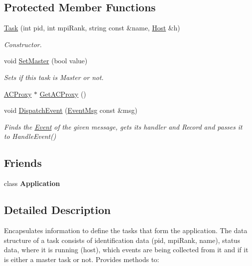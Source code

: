 \subsection*{Protected Member Functions}
\begin{DoxyCompactItemize}
\item 
\hyperlink{class_model_1_1_task_a334ea9c1df40aebee576d9cf0646c0ea}{Task} (int pid, int mpi\-Rank, string const \&name, \hyperlink{class_model_1_1_host}{Host} \&h)
\begin{DoxyCompactList}\small\item\em Constructor. \end{DoxyCompactList}\item 
void \hyperlink{class_model_1_1_task_a013b50c42c6a729869d665c610b3cd09}{Set\-Master} (bool value)
\begin{DoxyCompactList}\small\item\em Sets if this task is Master or not. \end{DoxyCompactList}\item 
\hyperlink{class_a_c_proxy}{A\-C\-Proxy} $\ast$ \hyperlink{class_model_1_1_task_aec9e577c6b17988481d08e3922800e7d}{Get\-A\-C\-Proxy} ()
\item 
void \hyperlink{class_model_1_1_task_a632d2809726ca0afc77f04639860d5e5}{Dispatch\-Event} (\hyperlink{class_common_1_1_event_msg}{Event\-Msg} const \&msg)
\begin{DoxyCompactList}\small\item\em Finds the \hyperlink{class_model_1_1_event}{Event} of the given message, gets its handler and Record and passes it to Handle\-Event() \end{DoxyCompactList}\end{DoxyCompactItemize}
\subsection*{Friends}
\begin{DoxyCompactItemize}
\item 
\hypertarget{class_model_1_1_task_a23f25bcc02a0e94c2f5a4188496b04d0}{class {\bfseries Application}}\label{class_model_1_1_task_a23f25bcc02a0e94c2f5a4188496b04d0}

\end{DoxyCompactItemize}


\subsection{Detailed Description}
Encapsulates information to define the tasks that form the application. The data structure of a task consists of identification data (pid, mpi\-Rank, name), status data, where it is running (host), which events are being collected from it and if it is either a master task or not. Provides methods to\-: 


